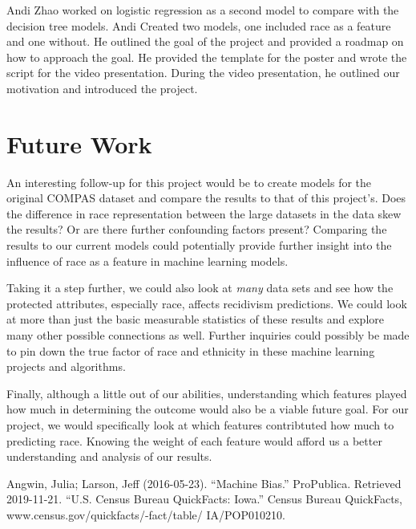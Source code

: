 \documentclass[11pt, sigconf]{acmart}
\begin{document}
Andi Zhao worked on logistic regression as a second model to compare with the decision tree models. Andi Created two models, one included race as a feature and one without. He outlined the goal of the project and provided a roadmap on how to approach the goal. He provided the template for the poster and wrote the script for the video presentation. During the video presentation, he outlined our motivation and introduced the project. 

\section{Future Work}

\hspace{5mm}An interesting follow-up for this project would be to create models for the original COMPAS dataset and compare the results to that of this project's. Does the difference in race representation between the large datasets in the data skew the results? Or are there further confounding factors present? Comparing the results to our current models could potentially provide further insight into the influence of race as a feature in machine learning models. 

Taking it a step further, we could also look at \emph{many} data sets and see how the protected attributes, especially race, affects recidivism predictions. We could look at more than just the basic measurable statistics of these results and explore many other possible connections as well. Further inquiries could possibly be made to pin down the true factor of race and ethnicity in these machine learning projects and algorithms. 

Finally, although a little out of our abilities, understanding which features played how much in determining the outcome would also be a viable future goal. For our project, we would specifically look at which features contribtuted how much to predicting race. Knowing the weight of each feature would afford us a better 
understanding and analysis of our results.

\begin{thebibliography}{1}

Angwin, Julia; Larson, Jeff (2016-05-23). ``Machine Bias.'' ProPublica. Retrieved 2019-11-21.
``U.S. Census Bureau QuickFacts: Iowa.'' Census Bureau QuickFacts, www.census.gov/quickfacts/-fact/table/
IA/POP010210.

\end{thebibliography}
\end{document}
